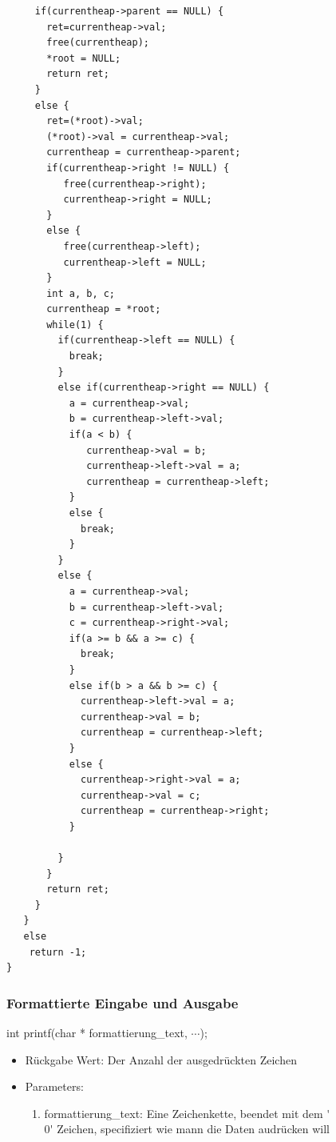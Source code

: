 \documentclass{article}[12pt]
\newenvironment{myexampleblock}[1]{%
    \tcolorbox[beamer,%
    noparskip,breakable,
    colback=White,colframe=ForestGreen,%
    colbacklower=LimeGreen!75!White,%
    title=#1]}%
    {\endtcolorbox}
\newenvironment{myexampleprogram}[1]{%
    \tcolorbox[beamer,%
    noparskip,breakable,
    colback=White,colframe=Goldenrod,%
    colbacklower=Yellow!75!White,%
    title=#1]}%
    {\endtcolorbox}
\begin{document}
\begin{myexampleprogram}{Programme: \texttt{Haldensortierung}}
\begin{lstlisting}
     if(currentheap->parent == NULL) {
       ret=currentheap->val;
       free(currentheap);
       *root = NULL;
       return ret;
     }
     else {
       ret=(*root)->val;
       (*root)->val = currentheap->val;
       currentheap = currentheap->parent;
       if(currentheap->right != NULL) {
          free(currentheap->right);
          currentheap->right = NULL;
       }
       else {
          free(currentheap->left);
          currentheap->left = NULL;
       }
       int a, b, c;
       currentheap = *root;
       while(1) {
         if(currentheap->left == NULL) {
           break;
         }
         else if(currentheap->right == NULL) {
           a = currentheap->val;
           b = currentheap->left->val;
           if(a < b) {
              currentheap->val = b;
              currentheap->left->val = a;
              currentheap = currentheap->left;
           }
           else {
             break;
           }
         }
         else {
           a = currentheap->val;
           b = currentheap->left->val;
           c = currentheap->right->val;
           if(a >= b && a >= c) {
             break;
           }
           else if(b > a && b >= c) {
             currentheap->left->val = a;
             currentheap->val = b;
             currentheap = currentheap->left;
           }
           else {
             currentheap->right->val = a;
             currentheap->val = c;
             currentheap = currentheap->right;
           }

         }
       }
       return ret;
     }
   }
   else
    return -1;
}
\end{lstlisting}
\end{myexampleprogram}
\subsubsection{Formattierte Eingabe und Ausgabe}
\begin{myexampleblock}{Function definition \texttt{printf}}
int printf(char * formattierung\_text, $\cdots$);
\begin{itemize}
\item Rückgabe Wert: Der Anzahl der ausgedrückten Zeichen
\item Parameters:
\begin{enumerate}
\item formattierung\_text: Eine Zeichenkette, beendet mit dem \'{}\\0\'{} Zeichen, specifiziert wie mann die Daten
audrücken will
\end{enumerate}
\end{itemize}
\end{myexampleblock}
\pagebreak
\end{document}
